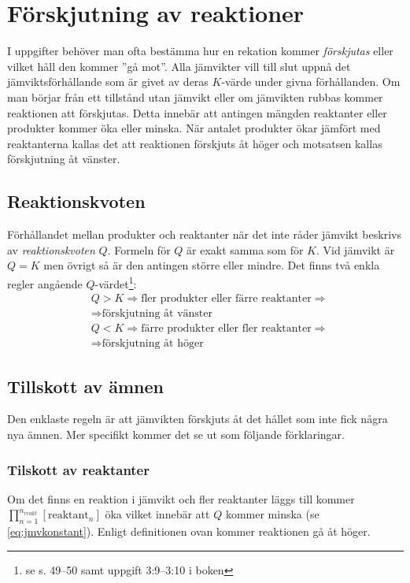 \section{Förskjutning av reaktioner}

I uppgifter behöver man ofta bestämma hur en rekation kommer \emph{förskjutas} eller vilket håll den kommer ''gå mot''. Alla jämvikter vill till slut uppnå det jämviktsförhållande som är givet av deras $K$-värde under givna förhållanden. Om man börjar från ett tillstånd utan jämvikt eller om jämvikten rubbas kommer reaktionen att förskjutas. Detta innebär att antingen mängden reaktanter eller produkter kommer öka eller minska. När antalet produkter ökar jämfört med reaktanterna kallas det att reaktionen förskjuts åt höger och motsatsen kallas förskjutning åt vänster.

\subsection{Reaktionskvoten}

Förhållandet mellan produkter och reaktanter när det inte råder jämvikt beskrivs av \emph{reaktionskvoten} $Q$. Formeln för $Q$ är exakt samma som för $K$. Vid jämvikt är $Q=K$ men övrigt så är den antingen större eller mindre. Det finns två enkla regler angående $Q$-värdet\footnote{se s. 49--50 samt uppgift 3:9--3:10 i boken}:
\begin{align*}
    &Q > K \Rightarrow \text{fler produkter eller färre reaktanter} \Rightarrow \\ 
    &\Rightarrow \text{förskjutning åt vänster} \\
    &Q < K \Rightarrow \text{färre produkter eller fler reaktanter} \Rightarrow \\ 
    &\Rightarrow \text{förskjutning åt höger}
\end{align*}

\subsection{Tillskott av ämnen}
Den enklaste regeln är att jämvikten förskjuts åt det hållet som inte fick några nya ämnen. Mer specifikt kommer det se ut som följande förklaringar.

\subsubsection[Reaktanter]{Tilskott av reaktanter}
Om det finns en reaktion i jämvikt och fler reaktanter läggs till kommer $\prod^{n_{reakt}}_{n=1}[\mathrm{reaktant}_n]$ öka vilket innebär att $Q$ kommer minska (se \cref{eq:jmvkonstant}). Enligt definitionen ovan kommer reaktionen gå åt höger.
